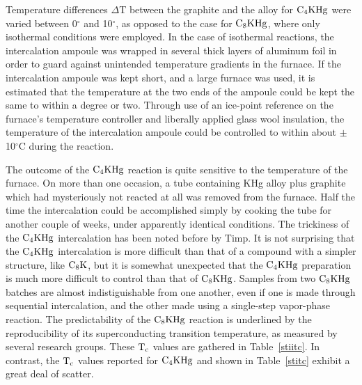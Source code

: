         Temperature  differences $\Delta$T  between  the  graphite and  the
alloy for $\rm C_4KHg$ were varied between 0$^{\circ}$ and 10$^{\circ}$, as
opposed to the case for $\rm C_8KHg$, where only isothermal conditions were
employed.  In  the case of isothermal reactions,  the intercalation ampoule
was wrapped in several thick  layers  of aluminum foil  in order  to  guard
against   unintended temperature   gradients in  the     furnace.   If  the
intercalation ampoule was kept short, and a large  furnace was used,  it is
estimated that the temperature at the two ends of the ampoule could be kept
the same to within a degree or two.  Through use  of an ice-point reference
on the  furnace's temperature controller and  liberally applied  glass wool
insulation,  the  temperature   of  the  intercalation    ampoule  could be
controlled to within about $\pm$10$^{\circ}$C during the reaction.

        The outcome of the $\rm C_4KHg$ reaction is quite sensitive  to the
temperature of the furnace.  On  more than one occasion, a  tube containing
KHg alloy  plus  graphite which had  mysteriously  not reacted  at all  was
removed  from   the  furnace.  Half  the time  the  intercalation  could be
accomplished simply by cooking the tube for another  couple of weeks, under
apparently   identical conditions.   The  trickiness   of the  $\rm C_4KHg$
intercalation  has been noted    before by   Timp.\cite{J140}  It   is  not
surprising that the $\rm C_4KHg$ intercalation is more  difficult than that
of a compound with a simpler structure, like $\rm C_8K$, but it is somewhat
unexpected that  the $\rm  C_4KHg$ preparation  is much  more difficult  to
control than that of $\rm C_8KHg$.  Samples from two  $\rm  C_8KHg$ batches
are almost indistiguishable  from one another, even  if one is made through
sequential   intercalation,  and  the other    made  using  a   single-step
vapor-phase reaction.  The predictability  of the  $\rm C_8KHg$ reaction is
underlined    by the  reproducibility  of   its superconducting  transition
temperature, as measured   by several  research  groups.  These  $\rm  T_c$
values are  gathered in  Table~\ref{stiitc}.   In contrast, the  $\rm  T_c$
values reported for $\rm  C_4KHg$ and shown  in Table~\ref{stitc} exhibit a
great deal of scatter.

